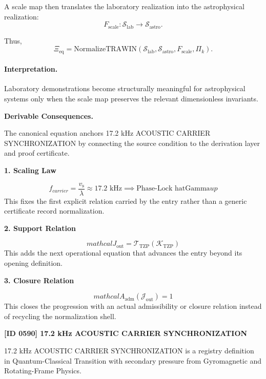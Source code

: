 A scale map then translates the laboratory realization into the astrophysical realization:
\begin{equation}
F_{\mathrm{scale}}:
\mathcal{S}_{\mathrm{lab}}
\to
\mathcal{S}_{\mathrm{astro}} .
\end{equation}

Thus,
\begin{equation}
\boxed{
\Xi_{\mathrm{eq}}
=
\mathrm{NormalizeTRAWIN}
\left(
\mathcal{S}_{\mathrm{lab}},
\mathcal{S}_{\mathrm{astro}},
F_{\mathrm{scale}},
\Pi_k
\right).
}
\end{equation}

\paragraph{Interpretation.}
Laboratory demonstrations become structurally meaningful for astrophysical systems only when the scale map preserves the relevant dimensionless invariants.

\par\vspace{0.35em}
\noindent\textbf{Derivable Consequences.}\quad
\begingroup
\footnotesize
\raggedright
The canonical equation anchors 17.2 kHz ACOUSTIC CARRIER SYNCHRONIZATION by connecting the source condition to the derivation layer and proof certificate.
\par\endgroup

\noindent\textbf{1. Scaling Law}\par
\[
f_{carrier} = \frac{v_{\mathrm{s}}}{\lambda} \approx 17.2 \text{ kHz} \implies \text{Phase-Lock } \mathrm{hat}{\mathrm{Gamma}} {up}
\]
\noindent This fixes the first explicit relation carried by the entry rather than a generic certificate record normalization.\par
\noindent\textbf{2. Support Relation}\par
\[
mathcal{J}_{\mathrm{out}} = \mathcal{T}_{\mathrm{TZP}}\!\left(\mathcal{K}_{\mathrm{TZP}}\right)
\]
\noindent This adds the next operational equation that advances the entry beyond its opening definition.\par
\noindent\textbf{3. Closure Relation}\par
\[
mathcal{A}_{\mathrm{adm}}\!\left(\mathcal{J}_{\mathrm{out}}\right)=1
\]
\noindent This closes the progression with an actual admissibility or closure relation instead of recycling the normalization shell.\par

\clearpage
\noindent\textbf{[ID 0590] 17.2 kHz ACOUSTIC CARRIER SYNCHRONIZATION}\par
\vspace{0.35em}
\begingroup\small
{}
17.2 kHz ACOUSTIC CARRIER SYNCHRONIZATION is a registry definition in Quantum-Classical Transition with secondary pressure from Gyromagnetic and Rotating-Frame Physics.

